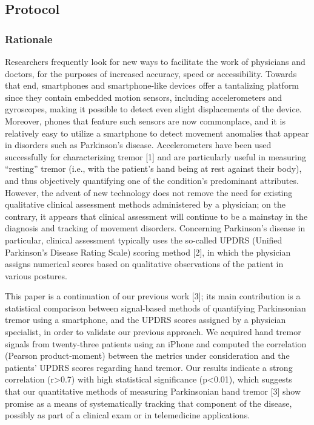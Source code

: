 \subsection{Protocol}
\label{subsec:SmartCT2Protocol}

\subsubsection{Rationale}
\label{subsubsec:smartCT2Rationale}
Researchers frequently look for new ways to facilitate the work of physicians and doctors, for the purposes of increased accuracy, speed or accessibility. Towards that end, smartphones and smartphone-like devices offer a tantalizing platform since they contain embedded motion sensors, including accelerometers and gyroscopes, making it possible to detect even slight displacements of the device. Moreover, phones that feature such sensors are now commonplace, and it is relatively easy to utilize a smartphone to detect movement anomalies that appear in disorders such as Parkinson’s disease. Accelerometers have been used successfully for characterizing tremor [1] and are particularly useful in measuring “resting” tremor (i.e., with the patient’s hand being at rest against their body), and thus objectively quantifying one of the condition’s predominant attributes. However, the advent of new technology does not remove the need for existing qualitative clinical assessment methods administered by a physician; on the contrary, it appears that clinical assessment will continue to be a mainstay in the diagnosis and tracking of movement disorders. Concerning Parkinson’s disease in particular, clinical assessment typically uses the so-called UPDRS (Unified Parkinson’s Disease Rating Scale) scoring method [2], in which the physician assigns numerical scores based on qualitative observations of the patient in various postures. 

This paper is a continuation of our previous work [3]; its main contribution is a statistical comparison between signal-based methods of quantifying Parkinsonian tremor using a smartphone, and the UPDRS scores assigned by a physician specialist, in order to validate our previous approach. We acquired hand tremor signals from twenty-three patients using an iPhone and computed the correlation (Pearson product-moment) between the metrics under consideration and the patients’ UPDRS scores regarding hand tremor. Our results indicate a strong correlation (r>0.7) with high statistical significance (p<0.01), which suggests that our quantitative methods of measuring Parkinsonian hand tremor [3] show promise as a means of systematically tracking that component of the disease, possibly as part of a clinical exam or in telemedicine applications. 

